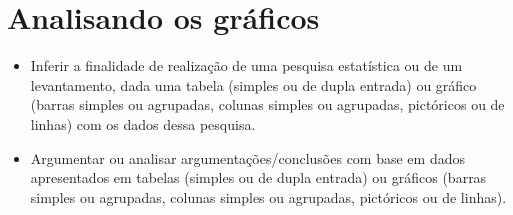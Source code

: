 
\chapter{Analisando os gráficos}


\begin{itemize}
\item Inferir a finalidade de realização de uma pesquisa estatística ou de
um levantamento, dada uma tabela (simples ou de dupla entrada) ou
gráfico (barras simples ou agrupadas, colunas simples ou agrupadas,
pictóricos ou de linhas) com os dados dessa pesquisa.

\item Argumentar ou analisar argumentações/conclusões com base em dados
apresentados em tabelas (simples ou de dupla entrada) ou gráficos
(barras simples ou agrupadas, colunas simples ou agrupadas, pictóricos
ou de linhas).
\end{itemize}

